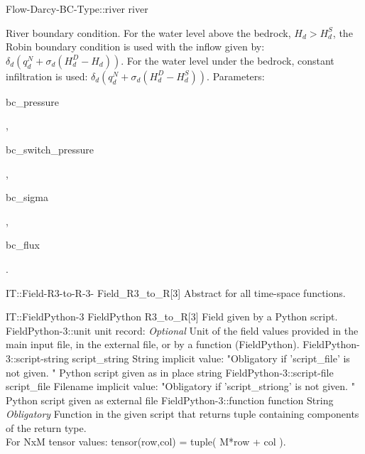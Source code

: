 \begin{SelectionType}
{{}}
		\SelectionItem
			{Flow-Darcy-BC-Type::river}
			{river}
			{{{River boundary condition.
For the water level above the bedrock, }{$H_d > H_d^S$}{, the Robin boundary condition is used with the inflow given by: }{ $ \delta_d(q_d^N + \sigma_d(H_d^D - H_d) )$}{. For the water level under the bedrock, constant infiltration is used: }{ $ \delta_d(q_d^N + \sigma_d(H_d^D - H_d^S) )$}{. Parameters: }\begin{ttfamily}bc{\_}pressure\end{ttfamily}{, }\begin{ttfamily}bc{\_}switch{\_}pressure\end{ttfamily}{,  }\begin{ttfamily}bc{\_}sigma\end{ttfamily}{, }\begin{ttfamily}bc{\_}flux\end{ttfamily}{.}%
}}
\end{SelectionType}
\begin{AbstractType}
	{IT::Field-R3-to-R-3-}
	{Field{\_}R3{\_}to{\_}R[3]}
	{}
	{{{Abstract for all time-space functions.}%
}}
\end{AbstractType}
\begin{RecordType}
	{IT::FieldPython-3}
	{FieldPython}
	{}%
	{}%
	{{{R3{\_}to{\_}R[3] Field given by a Python script.}%
}}
		\RecKey
			{FieldPython-3::unit}
			{unit}
			{{record: }}{}
			{ \it{Optional}}
			{{{Unit of the field values provided in the main input file, in the external file, or by a function (FieldPython).}%
}}
		\RecKey
			{FieldPython-3::script-string}
			{script{\_}string}
			{{String}}{}
			{implicit value: "{Obligatory if 'script{\_}file' is not given. }"}
			{{{Python script given as in place string}%
}}
		\RecKey
			{FieldPython-3::script-file}
			{script{\_}file}
			{{Filename}}{}
			{implicit value: "{Obligatory if 'script{\_}striong' is not given. }"}
			{{{Python script given as external file}%
}}
		\RecKey
			{FieldPython-3::function}
			{function}
			{{String}}{}
			{ \it{Obligatory}}
			{{{Function in the given script that returns tuple containing components of the return type.}\\{
For NxM tensor values: tensor(row,col) = tuple( M*row + col ).}%
}}
\end{RecordType}
